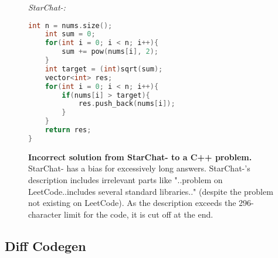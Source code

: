 \begin{figure}[htbp]
\hrulefill

\emph{StarChat-:}

\hrulefill

\begin{lstlisting}[language=C++,breaklines=true,basicstyle=\ttfamily\scriptsize]
    int n = nums.size();
    int sum = 0;
    for(int i = 0; i < n; i++){
        sum += pow(nums[i], 2);
    }
    int target = (int)sqrt(sum);
    vector<int> res;
    for(int i = 0; i < n; i++){
        if(nums[i] > target){
            res.push_back(nums[i]);
        }
    }
    return res;
}
\end{lstlisting}

\hrulefill
\caption{\textbf{Incorrect solution from StarChat- to a \evale{} C++ problem.} StarChat- has a bias for excessively long answers. StarChat-'s description includes irrelevant parts like "..problem on LeetCode..includes several standard libraries.." (despite the problem not existing on LeetCode). As the description exceeds the 296-character limit for the code, it is cut off at the end.}
\label{fig:starchatbetacpp}
\end{figure}


\FloatBarrier



\subsection{Diff Codegen}
\label{sec:examplesdiffcodegen}

